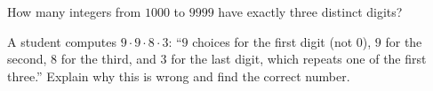 How many integers from $1000$ to $9999$ have exactly three distinct digits?

A student computes $9\cdot9\cdot8\cdot3$: ``$9$ choices for the first digit (not $0$), $9$ for the second, $8$ for the third, and $3$ for the last digit, which repeats one of the first three.'' Explain why this is wrong and find the correct number.
